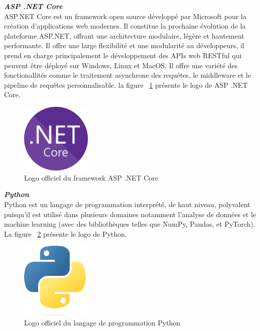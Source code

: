 \noindent
{\small\textbf{\textit{ASP .NET Core}}}\mbox{}\\
ASP.NET Core est un framework open source développé par Microsoft pour la création d'applications web modernes. Il constitue la prochaine évolution de la plateforme ASP.NET, offrant une architecture modulaire, légère et hautement performante. Il offre une large flexibilité et une modularité au développeurs, il prend en charge principalement le développement des APIs web RESTful qui peuvent être déployé sur Windows, Linux et MacOS. Il offre une variété des fonctionallités comme le traitement asynchrone des requêtes, le middleware et le pipeline de requêtes personnalisable.
la figure ~\ref{fig:netcore} présente le logo de ASP .NET Core.
\begin{figure}[H]
\centering
\includegraphics[width=0.3\textwidth]{logos/dotnetcore.png}
\caption{Logo officiel du framework ASP .NET Core}
\label{fig:netcore}
\end{figure}

\noindent
{\small\textbf{\textit{Python}}}\mbox{}\\
Python est un langage de programmation interprété, de haut niveau, polyvalent puisqu'il est utilisé dans plusieurs domaines notamment l'analyse de données et le machine learning (avec des bibliothèques telles que NumPy, Pandas, et PyTorch). La figure ~\ref{fig:py} présente le logo de Python.
\begin{figure}[H]
\centering
\includegraphics[width=0.3\textwidth]{logos/pypng.png}
\caption{Logo officiel du langage de programmation Python}
\label{fig:py}
\end{figure}

